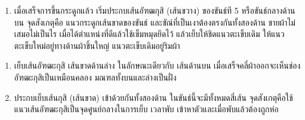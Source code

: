 \setlength{\nextPhotoWidth}{0.5\textwidth}



\begin{enumerate}
\def\labelenumi{(\arabic{enumi})}
\setcounter{enumi}{1}
\tightlist
\item
  เมื่อเสร็จการขึ้นกระดูกแล้ว เริ่มประกบเส้นอัฑฒกุสิ (เส้นขวาง)
  ของขันธ์ที 5 หรือขันธ์กลางด้านบน จุดสังเกตุคือ
  แนวกระดูกเส้นขาดของขันธ์ และขัณ์ที่เป็นเงาต้องตรงกันทั้งสองด้าน
  ชายผ้าไม่เสมอไม่เป็นไร เมื่อได้ตำแหน่งที่ดีแล้วใช้เข็มหมุดยึดไว้
  แล้วเย็บให้ชิดแนวตะเข็บเดิม ให้แนวตะเข็บใหม่อยู่ทางด้านผ้าชิ้นใหญ่
  แนวตะเข็บเดิมอยู่ริมผ้า
\end{enumerate}

\setlength{\nextPhotoWidth}{0.45\textwidth}



\setlength{\nextPhotoWidth}{0.45\textwidth}



\setlength{\nextPhotoWidth}{0.45\textwidth}



\setlength{\nextPhotoWidth}{0.45\textwidth}



\begin{enumerate}
\def\labelenumi{(\arabic{enumi})}
\setcounter{enumi}{2}
\item
  เย็บเส้นอัฑฒะกุสิ เส้นขาดด้านล่าง ในลักษณะเดียวกับ เส้นด้านบน
  เมื่อเสร็จคลี่ผ้าออกจะเห็นช่อง อัฑฒะกุสิเป็นเหมือนคลอง
  มณฑลทั้งบนและล่างเป็นฝั่ง
\item
  ประกบเย็บเส้นกุสิ (เส้นขาด) เข้าด้วยกันทั้งสองด้าน
  ในขันธ์นี้จะมีทั้งหมดสี่เส้น
  จุดสังเกตุคือใช้แนวเส้นอัฑฒะกุสิเป็นจุดศูนย์กลางในการเย็บ เวลาพับ
  เข้าหาตัวและเมื่อพับแล้วต้องถูกห่อ
\end{enumerate}

